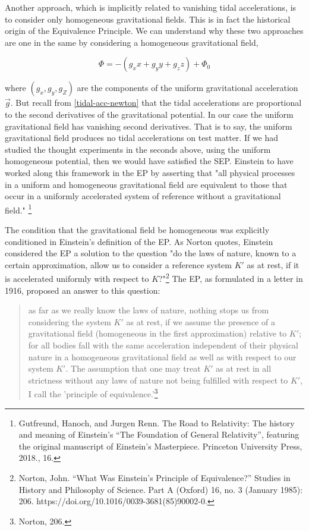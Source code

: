 \documentclass[11pt]{article}
\begin{document}
Another approach, which is implicitly related to vanishing tidal accelerations, is to consider only homogeneous gravitational fields. This is in fact the historical origin of the Equivalence Principle. We can understand why these two approaches are one in the same by considering a homogeneous gravitational field,

\begin{equation}
    \Phi = -(g_x x + g_y y + g_z z) + \Phi_0
\end{equation}

where $(g_x,g_y,g_Z)$ are the components of the uniform gravitational acceleration $\vec{g}$. But recall from \eqref{tidal-acc-newton} that the tidal accelerations are proportional to the second derivatives of the gravitational potential. In our case the uniform gravitational field has vanishing second derivatives. That is to say, the uniform gravitational field produces no tidal accelerations on test matter. If we had studied the thought experiments in the seconds above, using the uniform homogeneous potential, then we would have satisfied the SEP. Einstein to have worked along this framework in the EP by asserting that "all physical processes in a uniform and homogeneous gravitational field are equivalent to those that occur in a uniformly accelerated system of reference without a gravitational field." \footnote{Gutfreund, Hanoch, and Jurgen Renn. The Road to Relativity: The history and meaning of Einstein's “The Foundation of General Relativity”, featuring the original manuscript of Einstein’s Masterpiece. Princeton University Press, 2018., 16.}

The condition that the gravitational field be homogeneous was explicitly conditioned in Einstein's definition of the EP. As Norton quotes, Einstein considered the EP a solution to the question "do the laws of nature, known to a certain approximation, allow us to consider a reference system $K'$ as at rest, if it is accelerated uniformly with respect to $K$?"\footnote{Norton, John. “What Was Einstein’s Principle of Equivalence?” Studies in History and Philosophy of Science. Part A (Oxford) 16, no. 3 (January 1985): 206. https://doi.org/10.1016/0039-3681(85)90002-0.} The EP, as formulated in a letter in 1916, proposed an answer to this question:

\begin{quote}
    as far as we really know the laws of nature, nothing stops us from considering the system $K'$ as at rest, if we assume the presence of a gravitational field (homogeneous in the first approximation) relative to $K'$; for all bodies fall with the same acceleration independent of their physical nature in a homogeneous gravitational field as well as with respect to our system $K'$. The assumption that one may treat $K'$ as at rest in all strictness without any laws of nature not being fulfilled with respect to $K'$, I call the 'principle of equivalence.'\footnote{Norton, 206.}
\end{quote}
\end{document}
